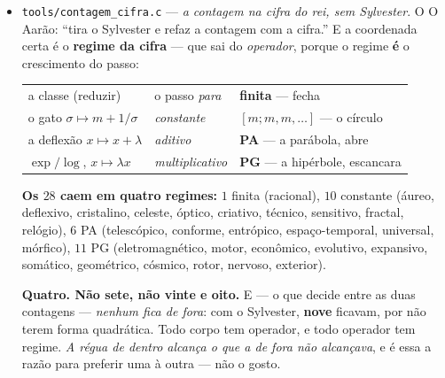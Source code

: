 \documentclass[11pt]{article}
\newcommand{\code}[1]{\texttt{\small #1}}
\theoremstyle{plain}
\theoremstyle{remark}
\begin{document}
\begin{itemize}
Medido: com termos todos $1$, $q_n$ é \textbf{Fibonacci} e a razão tende a $\varphi$ --- o
crescimento \emph{mínimo possível}, e por isso o número mais mal aproximável que há. Com PA os
termos são ilimitados, logo a cifra não é periódica e o número \emph{sai da família real}. Com PG
o crescimento é duplamente exponencial --- aproximação de qualquer ordem, o regime de Liouville.

\textbf{E o mecanismo é o termo seguinte:} $q_{n+1} = a_{n+1}q_n + q_{n-1}$, e
$|\alpha - p_n/q_n| \approx 1/(q_nq_{n+1})$ --- logo \emph{o tamanho do termo é a abertura}.
Constante $=$ fechado; crescente $=$ abre; explosivo $=$ escancarado.

\emph{O que não meço, e digo:} que os três regimes \textbf{sejam} elipse, parábola e hipérbole é
leitura dele, e não a provei. Que sejam \emph{três regimes distintos}, isso está medido --- e o
critério é standard: termos limitados $\iff$ mal aproximável.
\item \code{tools/contagem\_cifra.c} --- \emph{a contagem na cifra do rei, sem Sylvester}. O
O Aarão: ``tira o Sylvester e refaz a contagem com a cifra.'' E a coordenada certa é o \textbf{regime
da cifra} --- que sai do \emph{operador}, porque o regime \textbf{é} o crescimento do passo:

\begin{center}\begin{tabular}{lll}
a classe (reduzir) & o passo \emph{para} & \textbf{finita} --- fecha \\
o gato $\sigma \mapsto m + 1/\sigma$ & \emph{constante} & $[m;m,m,\dots]$ --- o círculo \\
a deflexão $x \mapsto x+\lambda$ & \emph{aditivo} & \textbf{PA} --- a parábola, abre \\
$\exp/\log$, $x \mapsto \lambda x$ & \emph{multiplicativo} & \textbf{PG} --- a hipérbole, escancara \\
\end{tabular}\end{center}

\textbf{Os $28$ caem em quatro regimes:} $1$ finita (racional), $10$ constante (áureo, deflexivo,
cristalino, celeste, óptico, criativo, técnico, sensitivo, fractal, relógio), $6$ PA (telescópico,
conforme, entrópico, espaço-temporal, universal, mórfico), $11$ PG (eletromagnético, motor,
econômico, evolutivo, expansivo, somático, geométrico, cósmico, rotor, nervoso, exterior).

\textbf{Quatro. Não sete, não vinte e oito.} E --- o que decide entre as duas contagens ---
\emph{nenhum fica de fora}: com o Sylvester, \textbf{nove} ficavam, por não terem forma
quadrática. Todo corpo tem operador, e todo operador tem regime. \emph{A régua de dentro alcança
o que a de fora não alcançava}, e é essa a razão para preferir uma à outra --- não o gosto.


\end{itemize}
\end{document}

